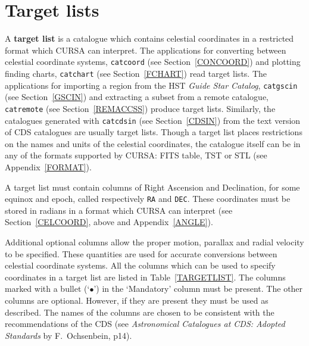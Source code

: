 \documentclass[twoside,11pt]{article}
\newcommand{\xlabel}[1]{}
\renewcommand{\_}{\texttt{\symbol{95}}}
\begin{document}
\section{\xlabel{TARGLIST}\label{TARGLIST}Target lists}

A {\bf target list} is a catalogue which contains celestial coordinates
in a restricted format which CURSA can interpret.  The applications for
converting between celestial coordinate systems, {\tt catcoord} (see
Section~\ref{CONCOORD}) and plotting finding charts, {\tt catchart} (see
Section~\ref{FCHART}) read target lists.  The applications for
importing a region from the HST {\it Guide Star Catalog}, {\tt catgscin}
(see Section~\ref{GSCIN})
and extracting a subset from a remote catalogue, {\tt catremote} (see
Section~\ref{REMACCSS}) produce target lists.  Similarly, the catalogues
generated with {\tt catcdsin} (see Section~\ref{CDSIN}) from the text
version of CDS catalogues are usually target lists.  Though a target
list places restrictions on the names and units of the celestial
coordinates, the catalogue itself can be in any of the formats supported
by CURSA: FITS table, TST or STL (see Appendix~\ref{FORMAT}).

A target list must contain columns of Right Ascension and Declination,
for some equinox and epoch, called respectively {\tt RA} and {\tt DEC}.
These coordinates must be stored in radians in a format which CURSA can
interpret (see Section~\ref{CELCOORD}, above and Appendix~\ref{ANGLE}).

Additional optional columns allow the proper motion, parallax and radial
velocity to be specified.  These quantities are used for accurate
conversions between celestial coordinate systems.  All the columns which
can be used to specify coordinates in a target list are listed in
Table~\ref{TARGETLIST}.  The columns marked with a bullet (`$\bullet$')
in the `Mandatory' column must be present.  The other columns are
optional. However, if they are present they must be used as described.
The names of the columns are chosen to be consistent with the
recommendations of the CDS (see {\it Astronomical Catalogues at CDS:
Adopted Standards} by F.~Ochsenbein\cite{CDSTAND}, p14).
\end{document}
